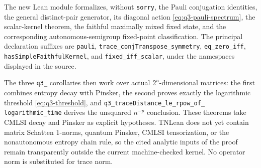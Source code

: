 \documentclass[class=article,11pt,a4paper,crop=false]{standalone}
\begin{document}
\begin{remark}\label{rem:q3-lean}
The new Lean module formalizes, without \texttt{sorry}, the Pauli conjugation
identities, the general distinct-pair generator, its diagonal action
\eqref{eq:q3-pauli-spectrum}, the scalar-kernel theorem, the faithful
maximally mixed fixed state, and the corresponding autonomous-semigroup
fixed-point classification. The principal declaration suffixes are
\texttt{pauli}, \texttt{trace\_conjTranspose\_symmetry},
\texttt{eq\_zero\_iff}, \texttt{hasSimpleFaithfulKernel}, and
\texttt{fixed\_iff\_scalar}, under the namespaces displayed in the source.

The three \texttt{q3\_} corollaries then work over actual
$2^n$-dimensional matrices: the first combines entropy decay with Pinsker, the
second proves exactly the logarithmic threshold \eqref{eq:q3-threshold}, and
\texttt{q3\_traceDistance\_le\_rpow\_of\_}\allowbreak
\texttt{logarithmic\_time} derives the unsquared $n^{-p}$ conclusion. These
theorems take CMLSI decay and Pinsker as explicit hypotheses. TNLean does not yet
contain matrix Schatten $1$-norms, quantum Pinsker, CMLSI tensorization, or the
nonautonomous entropy chain rule, so the cited analytic inputs of the proof
remain transparently outside the current machine-checked kernel. No operator
norm is substituted for trace norm.
\end{remark}

\ifstandalone


\fi
\end{document}
